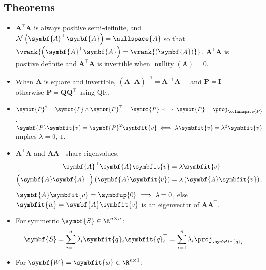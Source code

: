 \documentclass{article}
\DeclareMathOperator*{\nullity}{nullity}
\begin{document}
\begin{multicols*}{3}
    \section{Theorems}
    \begin{itemize}
        \item \(\symbf{A}^\top \symbf{A}\) is always positive semi-definite,
              and \(\mathcal{N}\left( \symbf{A}^\top\symbf{A} \right) = \nullspace{A}\) so that
              \(\vrank{\left( \symbf{A}^\top \symbf{A} \right) = \vrank{\left( \symbf{A} \right)}}\).
              \(\symbf{A}^\top \symbf{A}\) is positive definite and
              \(\symbf{A}^\top \symbf{A}\) is invertible when \(\nullity{\left( \symbf{A} \right)} = 0\).
        \item When \(\symbf{A}\) is square and invertible, \(\left( \symbf{A}^\top \symbf{A} \right)^{-1} = \symbf{A}^{-1} \symbf{A}^{-\top}\) and \(\symbf{P} = \symbf{I}\)
              otherwise \(\symbf{P} = \symbf{Q} \symbf{Q}^\top\) using QR\@.
        \item \(\symbf{P}^2 = \symbf{P} \land \symbf{P}^\top = \symbf{P} \iff \symbf{P} = \proj_{\columnspace{P}}\).
              \(\symbf{P} \symbfit{v} = \symbf{P}^2 \symbfit{v} \iff \lambda \symbfit{v} = \lambda^2 \symbfit{v}\) implies \(\lambda = 0,\: 1\).
        \item \(\symbf{A}^\top \symbf{A}\) and \(\symbf{A} \symbf{A}^\top\) share eigenvalues,
              \begin{align*}
                  \symbf{A}^\top \symbf{A} \symbfit{v}                                         & = \lambda \symbfit{v}                           \\
                  \left( \symbf{A} \symbf{A}^\top \right) \left( \symbf{A} \symbfit{v} \right) & = \lambda \left( \symbf{A} \symbfit{v} \right).
              \end{align*}
              \(\symbf{A} \symbfit{v} = \symbfup{0} \implies \lambda = 0\), else \(\symbfit{w} = \symbf{A} \symbfit{v}\) is an eigenvector of \(\symbf{A} \symbf{A}^\top\).
        \item For symmetric \(\symbf{S} \in \R^{n \times n}\):
              \begin{equation*}
                  \symbf{S} = \sum_{i = 1}^n \lambda_i \symbfit{q}_i \symbfit{q}_i^\top = \sum_{i = 1}^n \lambda_i \proj_{\symbfit{q}_i}
              \end{equation*}
        \item For \(\symbf{W} = \symbfit{w} \in \R^{n \times 1}\):
              \begin{align*}

\end{align*}
\end{itemize}
\end{multicols*}
\end{document}
